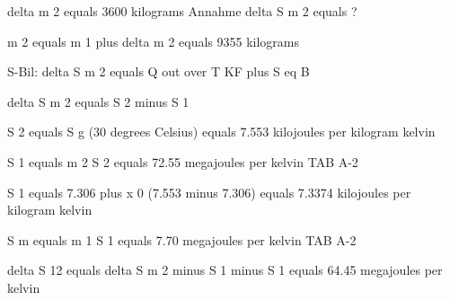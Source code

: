delta m 2 equals 3600 kilograms Annahme delta S m 2 equals ?

m 2 equals m 1 plus delta m 2 equals 9355 kilograms

S-Bil: delta S m 2 equals Q out over T KF plus S eq B

delta S m 2 equals S 2 minus S 1

S 2 equals S g (30 degrees Celsius) equals 7.553 kilojoules per kilogram kelvin

S 1 equals m 2 S 2 equals 72.55 megajoules per kelvin TAB A-2

S 1 equals 7.306 plus x 0 (7.553 minus 7.306) equals 7.3374 kilojoules per kilogram kelvin

S m equals m 1 S 1 equals 7.70 megajoules per kelvin TAB A-2

delta S 12 equals delta S m 2 minus S 1 minus S 1 equals 64.45 megajoules per kelvin